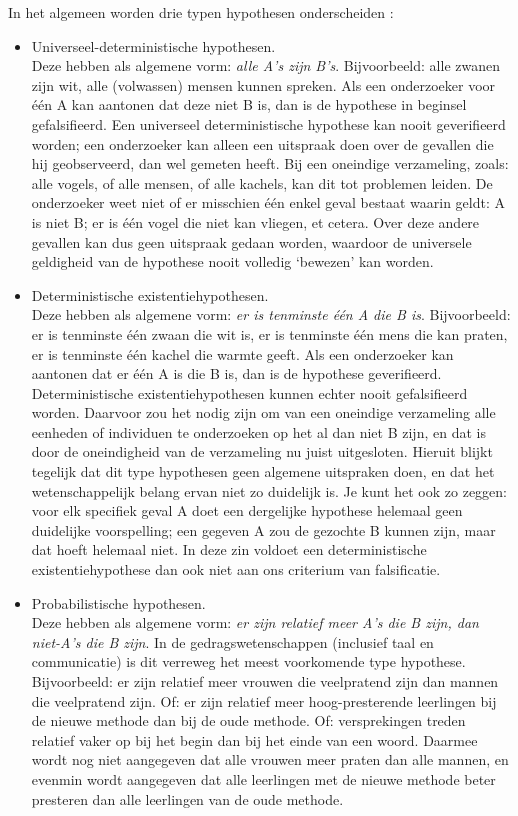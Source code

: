 \documentclass[
]{book}
\begin{document}
In het algemeen worden drie typen hypothesen onderscheiden \citep{Groot61}:

\begin{itemize}
\item
  Universeel-deterministische hypothesen.\\
  Deze hebben als algemene vorm: \emph{alle A's zijn B's}. Bijvoorbeeld: alle
  zwanen zijn wit, alle (volwassen) mensen kunnen spreken. Als een
  onderzoeker voor één A kan aantonen dat deze niet B is, dan is de
  hypothese in beginsel gefalsifieerd. Een universeel deterministische
  hypothese kan nooit geverifieerd worden; een onderzoeker kan alleen
  een uitspraak doen over de gevallen die hij geobserveerd, dan wel
  gemeten heeft. Bij een oneindige verzameling, zoals: alle vogels, of
  alle mensen, of alle kachels, kan dit tot problemen leiden. De
  onderzoeker weet niet of er misschien één enkel geval bestaat waarin
  geldt: A is niet B; er is één vogel die niet kan vliegen, et cetera.
  Over deze andere gevallen kan dus geen uitspraak gedaan worden,
  waardoor de universele geldigheid van de hypothese nooit volledig
  `bewezen' kan worden.
\item
  Deterministische existentiehypothesen.\\
  Deze hebben als algemene vorm: \emph{er is tenminste één A die B is}.
  Bijvoorbeeld: er is tenminste één zwaan die wit is, er is tenminste
  één mens die kan praten, er is tenminste één kachel die warmte
  geeft. Als een onderzoeker kan aantonen dat er één A is die B is,
  dan is de hypothese geverifieerd. Deterministische
  existentiehypothesen kunnen echter nooit gefalsifieerd worden.
  Daarvoor zou het nodig zijn om van een oneindige verzameling alle
  eenheden of individuen te onderzoeken op het al dan niet B zijn, en
  dat is door de oneindigheid van de verzameling nu juist uitgesloten.
  Hieruit blijkt tegelijk dat dit type hypothesen geen algemene
  uitspraken doen, en dat het wetenschappelijk belang ervan niet zo
  duidelijk is. Je kunt het ook zo zeggen: voor elk specifiek geval A
  doet een dergelijke hypothese helemaal geen duidelijke voorspelling;
  een gegeven A zou de gezochte B kunnen zijn, maar dat hoeft helemaal
  niet. In deze zin voldoet een deterministische existentiehypothese
  dan ook niet aan ons criterium van falsificatie.
\item
  Probabilistische hypothesen.\\
  Deze hebben als algemene vorm: \emph{er zijn relatief meer A's die B zijn,
  dan niet-A's die B zijn}.
  In de gedragswetenschappen (inclusief taal
  en communicatie) is dit verreweg het meest voorkomende type
  hypothese.\\
  Bijvoorbeeld: er zijn relatief meer vrouwen die veelpratend zijn dan
  mannen die veelpratend zijn. Of: er zijn relatief meer
  hoog-presterende leerlingen bij de nieuwe methode dan bij de oude
  methode. Of: versprekingen treden relatief vaker op bij het begin
  dan bij het einde van een woord. Daarmee wordt nog niet aangegeven
  dat alle vrouwen meer praten dan alle mannen, en evenmin wordt
  aangegeven dat alle leerlingen met de nieuwe methode beter presteren
  dan alle leerlingen van de oude methode.
\end{itemize}
\end{document}
